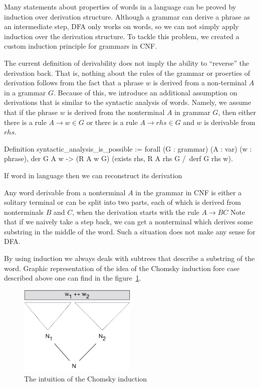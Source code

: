 Many statements about properties of words in a language can be proved by induction over derivation structure. Although a grammar can derive a phrase as an intermediate step, DFA only works on words, so we can not simply apply induction over the derivation structure. To tackle this problem, we created a custom induction principle for grammars in CNF.

The current definition of derivability does not imply the ability to ``reverse'' the derivation back. That is, nothing about the rules of the grammar or proerties of derivation follows from the fact that a phrase $w$ is derived from a non-terminal $A$ in a grammar $G$. Because of this, we introduce an additional assumption on derivations that is similar to the syntactic analysis of words.
Namely, we assume that if the phrase $w$ is derived from the nonterminal $A$ in grammar $G$, then either there is a rule $A \to w \in G$ or there is a rule $A \to rhs \in G$ and $w$ is derivable from $rhs$.

\begin{listing}[h]
    \begin{pyglist}[language=coq, numbers=none, numbersep=5pt]
Definition syntactic_analysis_is_possible :=
  forall (G : grammar) (A : var) (w : phrase),
  der G A w ->
   (R A w \in G) \/ 
   (exists rhs, R A rhs \in G /\ derf G rhs w).
  
  \end{pyglist}
    \caption{If word in language then we can reconstruct its derivation}
    \label{lst:synt-analysis-is-possible}
\end{listing}

Any word derivable from a nonterminal $A$ in the grammar in CNF is either a solitary terminal or can be split into two parts, each of which is derived from nonterminals $B$ and $C$, when the derivation starts with the rule $A \to B C$
Note that if we naively take a step back, we can get a nonterminal which derives some substring in the middle of the word. 
Such a situation does not make any sense for DFA.

By using induction we always deals with subtrees that describe a substring of the word.
Graphic representation of the idea of the Chomsky induction fore case described above one can find in the figure~\ref{fig:induction}.

\begin{figure}[htbp]
	\centering
	\includegraphics[width=0.5\textwidth]{ChomskyInductionIntuition}
	\caption{The intuition of the Chomsky induction}
	\label{fig:induction}
\end{figure}

